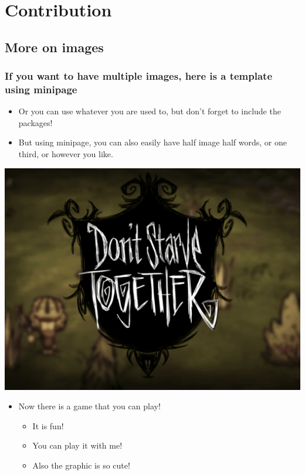 \documentclass[aspectratio=169]{beamer}
\begin{document}
\section{Contribution}
\subsection{More on images}

\begin{frame}[fragile]
	\frametitle{If you want to have multiple images, here is a template using minipage}
	\begin{itemize}
	    \item Or you can use whatever you are used to, but don't forget to include the packages! 
	    \item But using minipage, you can also easily have half image half words, or one third, or however you like.
	\end{itemize}

    \begin{minipage}{.5\textwidth}
      \centering
      \includegraphics[width=0.7\linewidth]{images/dst.png}
    \end{minipage}%
    \begin{minipage}{.5\textwidth}
      \begin{itemize}
          \item Now there is a game that you can play!
          \begin{itemize}
              \item It is fun!
              \item You can play it with me! 
              \item Also the graphic is so cute! 
          \end{itemize}
      \end{itemize}
    \end{minipage}
\end{frame}
\end{document}
